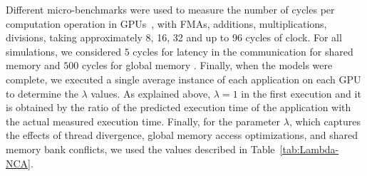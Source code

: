 \begin{table}[htpb]
\centering
{}
\caption{Values of the model parameters over 9 different vector/matrix applications}
\label{tab:Par-NCA} %
\end{table}

Different micro-benchmarks were used to measure the number of cycles per computation operation in GPUs~\citep{Bench:GPU}, with FMAs, additions, multiplications, divisions,  taking approximately 8, 16, 32 and up to 96 cycles of clock. For all simulations, we considered $5$ cycles for latency in the communication for shared memory and $500$ cycles for global memory \citep{CUDAGuide}. Finally, when the models were complete, we executed a single average instance of each application on each GPU to determine the $\lambda$ values. As explained above, $\lambda=1$ in the first execution and it is obtained by the ratio of the predicted execution time of the application with the actual measured execution time. Finally, for the parameter $\lambda$, which captures the effects of thread divergence, global memory access optimizations, and shared memory bank conflicts, we used the values described in Table~\ref{tab:Lambda-NCA}. 


